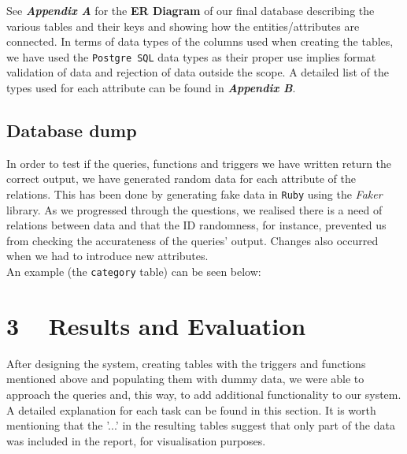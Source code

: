 \documentclass{article}
\begin{document}
\par {See \emph{\textbf{Appendix A}} for the \textbf{ER Diagram} of our final database describing the various tables and their keys and showing how the entities/attributes are connected. In terms of data types of the columns used when creating the tables, we have used the \texttt{Postgre SQL} data types \cite{link2} as their proper use implies format validation of data and rejection of data outside the scope. A detailed list of the types used for each attribute can be found in \emph{\textbf{Appendix B}}.}\\

\subsection{Database dump}
\par {In order to test if the queries, functions and triggers we have written return the correct output, we have generated random data for each attribute of the relations. This has been done by generating fake data in \texttt{Ruby} using the \emph{Faker} \cite{link3} library. As we progressed through the questions, we realised there is a need of relations between data and that the ID randomness, for instance, prevented us from checking the accurateness of the queries' output. Changes also occurred when we had to introduce new attributes. \\ An example (the \texttt{category} table) can be seen below:}\\




\section{3 ~  Results and Evaluation}
 \par {After designing the system, creating tables with the triggers and functions mentioned above and populating them with dummy data, we were able to approach the queries and, this way, to add additional functionality to our system. A detailed explanation for each task can be found in this section. It is worth mentioning that the '...' in the resulting tables suggest that only part of the data was included in the report, for visualisation purposes.}
\vspace{5pt}
\end{document}
